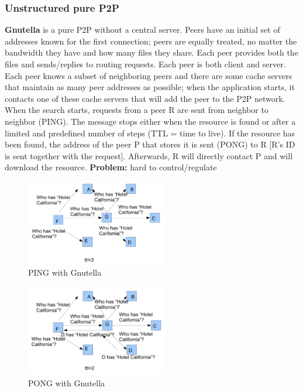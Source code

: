 \documentclass[paper=a4, fontsize=11pt]{scrartcl} %
\numberwithin{equation}{section} %
\numberwithin{figure}{section} %
\numberwithin{table}{section} %
\begin{document}
\subsubsection*{Unstructured pure P2P}
\textbf{Gnutella} is a pure P2P without a central server. Peers have an initial set of addresses known for the first connection; peers are equally treated, no matter the bandwidth they have and how many files they share. Each peer provides both the files and sends/replies to routing requests. Each peer is both client and server.\\
Each peer knows a subset of neighboring peers and there are some cache servers that maintain as many peer addresses as possible; when the application starts, it contacts one of these cache servers that will add the peer to the P2P network.\\
When the search starts, requests from a peer R are sent from neighbor to neighbor (PING). The message stops either when the resource is found or after a limited and predefined number of steps (TTL = time to live). If the resource has been found, the address of the peer P that stores it is sent (PONG) to R [R's ID is sent together with the request]. Afterwards, R will directly contact P and will download the resource.
\textbf{Problem:} hard to control/regulate 
 \begin{figure}[H]
  \centering
  \includegraphics[width=0.55\textwidth]{img/gnu1.png}
  \caption{PING with Gnutella}
  
\end{figure}
 \begin{figure}[H]
  \centering
  \includegraphics[width=0.55\textwidth]{img/gnu2.png}
  \caption{PONG with Gnutella}
  
\end{figure}
\end{document}
